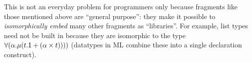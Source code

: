 \documentclass[10pt,preprint]{sigplanconf}
\begin{document}
This is not an everyday problem for programmers only because fragments like those mentioned above are ``general purpose'': they make it possible to \emph{isomorphically embed}  many other fragments as ``libraries''. For example, list types need not be built in because they are isomorphic to the type $\forall(\alpha.\mu(t.{\sf 1} + (\alpha \times t))))$ (datatypes in ML combine these into a single declaration construct). %
\end{document}
